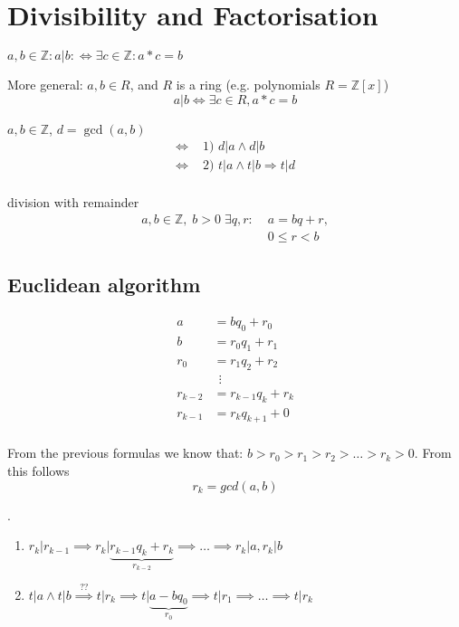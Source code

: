 
\section{Divisibility and Factorisation}

\begin{definition}
$a,b \in \mathbb{Z}: a|b: \Leftrightarrow \exists c \in \mathbb{Z}: a * c = b$

More general: 
$a,b \in R$, and $R$ is a ring (e.g. polynomials $R = \mathbb{Z}[x]$)
\[
  a|b \Leftrightarrow \exists c \in R , a * c = b
\]
\end{definition}

\begin{definition}
$a,b \in \mathbb{Z}$, $d = \gcd(a,b)$
\begin{align*}
    \Leftrightarrow & \text{ 1) } d|a \wedge d|b \\
    \Leftrightarrow & \text{ 2) } t|a \wedge t|b \Rightarrow t|d \\
\end{align*}
\end{definition}

\begin{definition}
division with remainder
\begin{align*}
  a,b \in \mathbb{Z}, \; 
  b > 0 \;\exists q,r: 
    & \; a = b q  + r, \\ 
    & \; 0 \leq r < b
\end{align*}
\end{definition}

\subsection{Euclidean algorithm}

\begin{align*}
  a &= b q_0 +r_0 \\
  b &= r_0 q_1 + r_1 \\
  r_0 &= r_1 q_2 + r_2\\
  &~~\vdots\\
  r_{k-2} &= r_{k-1}  q_k + r_k \\
  r_{k-1} &= r_{k}  q_{k+1} + 0 \\
\end{align*}

From the previous formulas we know that: $b > r_0 > r_1 > r_2 > \ldots > r_k > 0$. From this follows
\[
  r_k = gcd(a,b)
\]

\Proof.
\begin{enumerate}[1)]
  \item $r_k | r_{k-1} \implies r_k | \underbrace{r_{k-1} q_k + r_k}_{r_{k-2}}
         \implies \ldots \implies r_k | a, r_k | b$ \\
  \item $t | a \wedge t | b \stackrel{\text{??}}{\implies} t| r_k
         \implies t | \underbrace{a-bq_0}_{r_0} \implies t | r_1
         \implies \ldots \implies t|r_k$
\end{enumerate}

